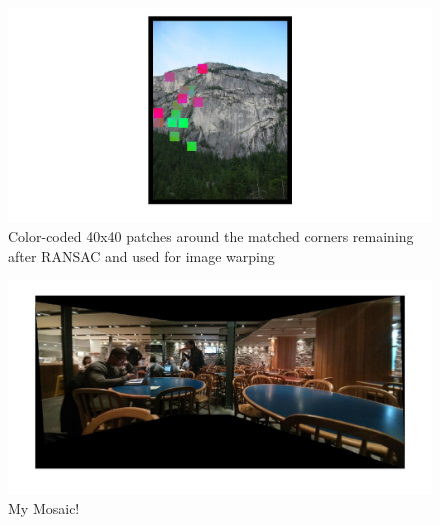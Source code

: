 \documentclass[english]{article}
\begin{document}
\begin{figure}[h!]
 \includegraphics[width=1\textwidth]{anms_realmatch2}
\caption{Color-coded 40x40 patches around the matched corners remaining after RANSAC and used for image warping}
\label{fig:test1}
 \end{figure}
 
 \begin{figure}[h!]
  \includegraphics[width=1\textwidth]{my_mosaic}
 \caption{My Mosaic!}
 \label{fig:test1}
  \end{figure}
   
\end{document}
